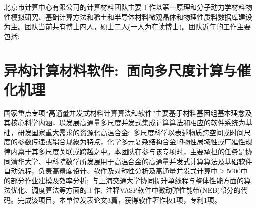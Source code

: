 \maketitle
北京市计算中心有限公司的计算材料团队主要工作以第一原理和分子动力学材料物性模拟研究、基础计算方法和稀土和半导体材料微观晶体和物理性质料数据库建设为主。团队当前共有博士四人，硕士二人(一人为在读博士)。团队近年的工作主要包括:

\section{异构计算材料软件:~面向多尺度计算与催化机理}
国家重点专项``高通量并发式材料计算算法和软件''主要基于材料基因组基本理念及其核心科学内涵，以发展高通量多尺度并发式集成计算算法和相应的软件系统为基础，研发国家重大需求的资源化高温合金:~多尺度科学以表述物质跨空间或时间尺度的参数传递或耦合现象为特点，化学多元复杂结构合金的物性局域性或广延性规律内禀于其多尺度关联或跨越之中。本团队在参与该专项时，主要承担的任务是协同清华大学、中科院数学所发展用于高温合金的高通量并发式计算算法及基础软件自动流程，负责高精度设计、软件及对称性分析及高通量并发式计算中$\geqslant5000$中的部分作业建模及效率分析;~与上海交通大学协同提升单线程与整体性能方面的算法优化、调度算法等方面的工作;~注释\textrm{VASP}软件中微动弹性能带\textrm{(NEB)}部分的代码。完成该项目，本单位发表论文3篇，获得软件著作权1项，专利1项。

